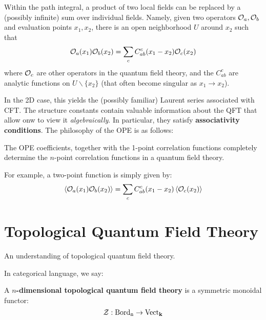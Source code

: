 		\begin{phys}
			 Within the path integral, a product of two local fields can be replaced by a (possibly infinite) sum over individual fields. Namely, given two operators $\mathcal{O}_a, \mathcal{O}_b$ and evaluation points $x_1, x_2$, there is an open neighborhood $U$ around $x_2$ such that
			\begin{equation}
				\mathcal{O}_a (x_1) \mathcal{O}_b(x_2) = \sum_c C_{ab}^c(x_1-x_2) \mathcal{O}_c(x_2)
			\end{equation}
		where $\mathcal{O}_c$ are other operators in the quantum field theory, and the $C_{ab}^c$ are analytic functions on $U \backslash \{ x_2 \}$ (that often become singular as $x_1 \to x_2$).
		\end{phys}
	
		In the 2D case, this yields the (possibly familiar) Laurent series associated with CFT. The structure constants contain valuable information about the QFT that allow onw to view it \emph{algebraically}. In particular, they satisfy \textbf{associativity conditions}. The philosophy of the OPE is as follows: %
		\begin{idea}
			The OPE coefficients, together with the 1-point correlation functions completely determine the $n$-point correlation functions in a quantum field theory. 
		\end{idea}
	\noindent 	For example, a two-point function is simply given by:
		\begin{equation}
			\left< \mathcal{O}_a(x_1) \mathcal{O}_b(x_2) \right> = \sum_c C^c_{ab}(x_1 - x_2) \left< \mathcal O_c (x_2) \right>
		\end{equation}
	
	
	
	\section{Topological Quantum Field Theory} %
	\label{sec:topological_quantum_field_theory}
	
	An understanding of topological quantum field theory. 
	
	In categorical language, we say:
	\begin{defn}
		A \textbf{$n$-dimensional topological quantum field theory} is a symmetric monoidal functor:
			\[
				\mathcal Z: \mathrm{Bord_n} \to \mathrm{Vect}_{\mathbf{k}}
			\]
	\end{defn} 
	
